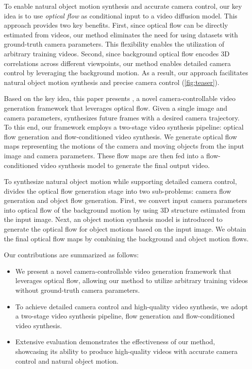 To enable natural object motion synthesis and accurate camera control,
our key idea is to use \emph{optical flow} as conditional input to a video diffusion model.
This approach provides two key benefits.
First, since optical flow can be directly estimated from videos, our method eliminates the need for using datasets with ground-truth camera parameters.
This flexibility enables the utilization of arbitrary training videos.
Second, since background optical flow encodes 3D correlations across different viewpoints, our method enables detailed camera control by leveraging the background motion.
As a result, our approach facilitates natural object motion synthesis and precise camera control (\cref{fig:teaser}).


Based on the key idea, this paper presents \emph{\MethodName{}}, a novel camera-controllable video generation framework that leverages optical flow.
Given a single image and camera parameters, \MethodName{} synthesizes future frames with a desired camera trajectory.
To this end, our framework employs a two-stage video synthesis pipeline: optical flow generation and flow-conditioned video synthesis.
We generate optical flow maps representing the motions of the camera and moving objects from the input image and camera parameters.
These flow maps are then fed into a flow-conditioned video synthesis model to generate the final output video.


To synthesize natural object motion while supporting detailed camera control, \MethodName{} divides the optical flow generation stage into two sub-problems: camera flow generation and object flow generation.
First, we convert input camera parameters into optical flow of the background motion by using 3D structure estimated from the input image.
Next, an object motion synthesis model is introduced to generate the optical flow for object motions based on the input image.
We obtain the final optical flow maps by combining the background and object motion flows.



Our contributions are summarized as follows:
\begin{itemize}
    \item We present a novel camera-controllable video generation framework that leverages optical flow, allowing our method to utilize arbitrary training videos without ground-truth camera parameters.
    \item To achieve detailed camera control and high-quality video synthesis, we adopt a two-stage video synthesis pipeline, flow generation and flow-conditioned video synthesis.
    \item Extensive evaluation demonstrates the effectiveness of our method, showcasing its ability to produce high-quality videos with 
    accurate camera control and natural object motion.
\end{itemize}
